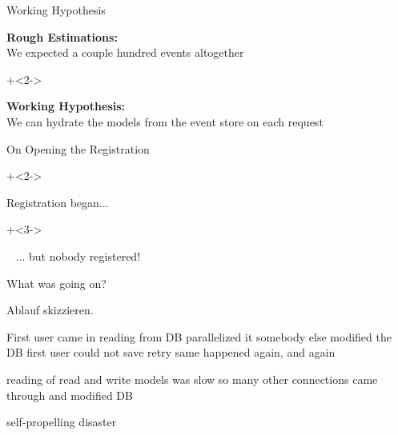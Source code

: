 \begin{frame}[fragile]{Working Hypothesis}

\textbf{Rough Estimations:} \\[.7em]
We expected a couple hundred events altogether

\onslide+<2->
\vspace{5em}

\textbf{Working Hypothesis:} \\[.7em]
We can hydrate the models from the event store on each request

\end{frame}


\begin{frame}[fragile]{On Opening the Registration}

\onslide+<2->

Registration began...

\onslide+<3->

\vspace{3em}

~ \hspace{10em} ... but nobody registered!
 
\end{frame}

\begin{frame}[fragile]{What was going on?}




\end{frame}





\begin{frame}[fragile]{}

Ablauf skizzieren. 
                  
                  First user came in
                  reading from DB parallelized it
                  somebody else modified the DB
                  first user could not save
                  retry
                  same happened again, and again
                  
                  reading of read and write models was slow
                  so many other connections came through and modified DB
                  
                  self-propelling disaster
                  
\end{frame}

